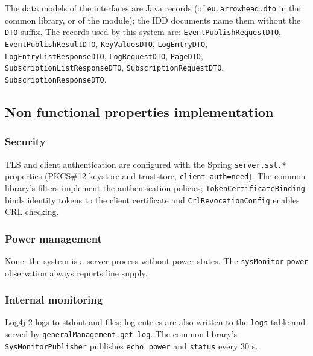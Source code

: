 \documentclass[a4paper]{arrowhead}
\begin{document}
The data models of the interfaces are Java records (of \texttt{eu.arrowhead.dto} in the common library, or of the module); the IDD documents name them without the \texttt{DTO} suffix. The records used by this system are: \texttt{Event\allowbreak{}Publish\allowbreak{}Request\allowbreak{}DTO}, \texttt{Event\allowbreak{}Publish\allowbreak{}Result\allowbreak{}DTO}, \texttt{KeyValuesDTO}, \texttt{LogEntryDTO}, \texttt{Log\allowbreak{}Entry\allowbreak{}List\allowbreak{}Response\allowbreak{}DTO}, \texttt{LogRequestDTO}, \texttt{PageDTO}, \texttt{Subscription\allowbreak{}List\allowbreak{}Response\allowbreak{}DTO}, \texttt{Subscription\allowbreak{}Request\allowbreak{}DTO}, \texttt{Subscription\allowbreak{}Response\allowbreak{}DTO}.

\subsection{Non functional properties implementation}

\subsubsection{Security}

TLS and client authentication are configured with the Spring \texttt{server.\allowbreak{}ssl.\allowbreak{}*} properties (PKCS\#12 keystore and truststore, \texttt{client-\allowbreak{}auth=\allowbreak{}need}). The common library's filters implement the authentication policies; \texttt{Token\allowbreak{}Certificate\allowbreak{}Binding} binds identity tokens to the client certificate and \texttt{Crl\allowbreak{}Revocation\allowbreak{}Config} enables CRL checking.

\subsubsection{Power management}

None; the system is a server process without power states. The \texttt{sysMonitor} \texttt{power} observation always reports line supply.

\subsubsection{Internal monitoring}

Log4j 2 logs to stdout and files; log entries are also written to the \texttt{logs} table and served by \texttt{general\allowbreak{}Management.\allowbreak{}get-\allowbreak{}log}. The common library's \texttt{Sys\allowbreak{}Monitor\allowbreak{}Publisher} publishes \texttt{echo}, \texttt{power} and \texttt{status} every 30 s.
\end{document}
